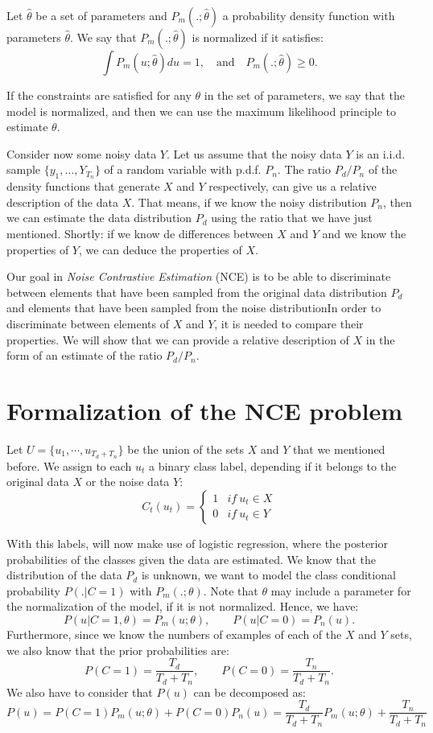 \begin{ndef}
Let $\hat{\theta}$ be a set of parameters and $P_m(.;\hat{\theta})$ a probability density function with parameters $\hat{\theta}$. We say that $P_m(.;\hat{\theta})$ is normalized if it satisfies:
$$
\int P_m(u;\hat{\theta})du = 1, \quad \text{and}\quad P_m(.;\hat{\theta})\geq 0.
$$
\end{ndef}

If the constraints are satisfied for any $\theta$ in the set of parameters, we say that the model is normalized, and then we can use the maximum likelihood principle to estimate $\theta$.

Consider now some noisy data $Y$. Let us assume that the noisy data $Y$ is an i.i.d. sample $\{y_1,\dots,Y_{T_n}\}$ of a random variable with p.d.f. $P_n$. The ratio $P_d/P_n$ of the density functions that generate $X$ and $Y$ respectively, can give us a relative description of the data $X$. That means, if we know the noisy distribution $P_n$, then we can estimate the data distribution $P_d$ using the ratio that we have just mentioned. Shortly: if we know de differences between $X$ and $Y$ and we know the properties of $Y$, we can deduce the properties of $X$.

Our goal in \emph{Noise Contrastive Estimation} (NCE) is to be able to discriminate between elements that have been sampled from the original data distribution $P_d$ and elements that have been sampled from the noise distributionIn order to discriminate between elements of $X$ and $Y$, it is needed to compare their properties. We will show that we can provide a relative description of $X$ in the form of an estimate of the ratio $P_d/P_n$.

\section{Formalization of the NCE problem}

Let $U = \{u_1,\cdots,u_{T_d + T_n}\}$ be the union of the sets $X$ and $Y$ that we mentioned before. We assign to each $u_t$ a binary class label, depending if it belongs to the original data $X$ or the noise data $Y$:
\[
C_t(u_t) = \begin{cases}
1 & if \ u_t \in X\\
0 & if \ u_t \in Y
\end{cases}
\]

With this labels, will now make use of logistic regression, where the posterior probabilities of the classes given the data are estimated. We know that the distribution of the data $P_d$ is unknown, we want to model the class conditional probability $P(.|C=1)$ with $P_m(.;\theta)$. Note that $\theta$ may include a parameter for the normalization of the model, if it is not normalized. Hence, we have:
\[
P(u|C = 1,\theta) = P_m(u;\theta), \quad \quad P(u|C = 0) = P_n(u).
\]
Furthermore, since we know the numbers of examples of each of the $X$ and $Y$ sets, we also know that the prior probabilities are:
\[
P(C = 1) = \frac{T_d}{T_d + T_n}, \quad \quad P(C = 0) = \frac{T_n}{T_d + T_n}.
\]
We also have to consider that $P(u)$ can be decomposed as:
\[
P(u) = P(C = 1) P_m(u; \theta) + P(C = 0)P_n(u) = \frac{T_d}{T_d + T_n} P_m(u;\theta) + \frac{T_n}{T_d + T_n}   
\]

